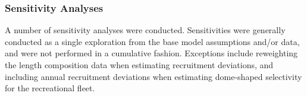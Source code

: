 \documentclass[11pt,
  english,
  a4paper,
]{article}
\begin{document}
\hypertarget{sensitivity-analyses}{%
\subsubsection{Sensitivity Analyses}\label{sensitivity-analyses}}

\leavevmode\tagmcend\tagstructend


A number of sensitivity analyses were conducted. Sensitivities were generally conducted as a single exploration from the base model assumptions and/or data, and were not performed in a cumulative fashion. Exceptions include reweighting the length composition data when estimating recruitment deviations, and including annual recruitment deviations when estimating dome-shaped selectivity for the recreational fleet.

\leavevmode\tagmcend\tagstructend\par
\end{document}
